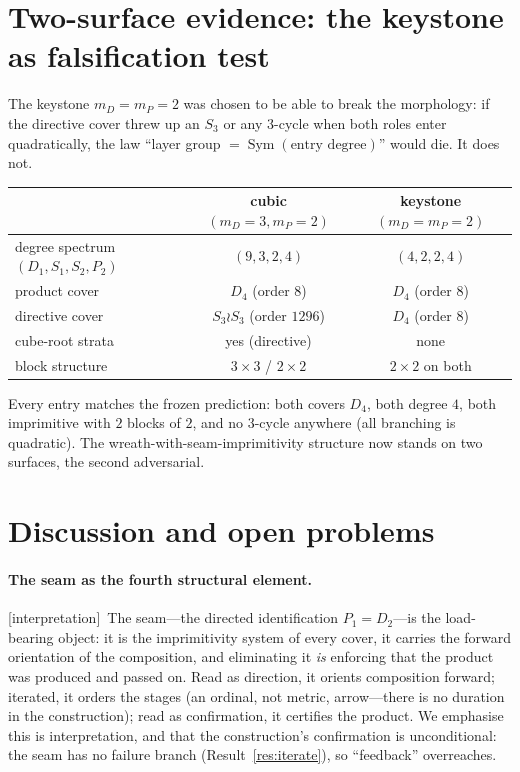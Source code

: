 \documentclass[11pt]{article}
\theoremstyle{plain}
\theoremstyle{definition}
\theoremstyle{remark}
\newcommand{\Interp}{\textsf{[interpretation]}}
\newcommand{\Sym}{\operatorname{Sym}}
\begin{document}
\section{Two-surface evidence: the keystone as falsification test}
\label{sec:keystone}

The keystone $m_D=m_P=2$ was chosen to be able to break the morphology: if the
directive cover threw up an $S_3$ or any $3$-cycle when both roles enter
quadratically, the law ``layer group $=\Sym(\text{entry degree})$'' would die. It
does not.

\begin{center}
\begin{tabular}{lcc}
\toprule
 & cubic $(m_D{=}3,m_P{=}2)$ & keystone $(m_D{=}m_P{=}2)$ \\
\midrule
degree spectrum $(D_1,S_1,S_2,P_2)$ & $(9,3,2,4)$ & $(4,2,2,4)$ \\
product cover & $D_4$ (order $8$) & $D_4$ (order $8$) \\
directive cover & $S_3\wr S_3$ (order $1296$) & $D_4$ (order $8$) \\
cube-root strata & yes (directive) & none \\
block structure & $3{\times}3$ / $2{\times}2$ & $2{\times}2$ on both \\
\bottomrule
\end{tabular}
\end{center}

\noindent Every entry matches the frozen prediction: both covers $D_4$, both
degree $4$, both imprimitive with $2$ blocks of $2$, and no $3$-cycle anywhere
(all branching is quadratic). The wreath-with-seam-imprimitivity structure now
stands on two surfaces, the second adversarial.

\section{Discussion and open problems}
\label{sec:discussion}

\paragraph{The seam as the fourth structural element.}\Interp\ The seam---the
directed identification $P_1=D_2$---is the load-bearing object: it is the
imprimitivity system of every cover, it carries the forward orientation of the
composition, and eliminating it \emph{is} enforcing that the product was produced
and passed on. Read as direction, it orients composition forward; iterated, it
orders the stages (an ordinal, not metric, arrow---there is no duration in the
construction); read as confirmation, it certifies the product. We emphasise this
is interpretation, and that the construction's confirmation is unconditional: the
seam has no failure branch (Result~\ref{res:iterate}), so ``feedback'' overreaches.
\end{document}
